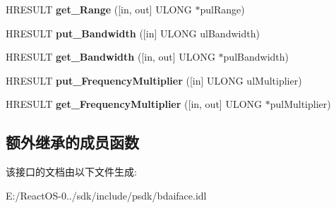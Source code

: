 \begin{DoxyCompactItemize}
H\+R\+E\+S\+U\+LT {\bfseries get\+\_\+\+Range} (\mbox{[}in, out\mbox{]} U\+L\+O\+NG $\ast$pul\+Range)
\item 
\mbox{\label{interface_i_b_d_a___frequency_filter_aa5e4841a9ed8de77df4f1f4f04350cd3}} 
H\+R\+E\+S\+U\+LT {\bfseries put\+\_\+\+Bandwidth} (\mbox{[}in\mbox{]} U\+L\+O\+NG ul\+Bandwidth)
\item 
\mbox{\label{interface_i_b_d_a___frequency_filter_a639ced69a4bcdd2f63bcd9ec842206bb}} 
H\+R\+E\+S\+U\+LT {\bfseries get\+\_\+\+Bandwidth} (\mbox{[}in, out\mbox{]} U\+L\+O\+NG $\ast$pul\+Bandwidth)
\item 
\mbox{\label{interface_i_b_d_a___frequency_filter_a9033135ba8c823d07924b8d399ed195d}} 
H\+R\+E\+S\+U\+LT {\bfseries put\+\_\+\+Frequency\+Multiplier} (\mbox{[}in\mbox{]} U\+L\+O\+NG ul\+Multiplier)
\item 
\mbox{\label{interface_i_b_d_a___frequency_filter_a455af6ea6d5e075ef03da3b80be0a41b}} 
H\+R\+E\+S\+U\+LT {\bfseries get\+\_\+\+Frequency\+Multiplier} (\mbox{[}in, out\mbox{]} U\+L\+O\+NG $\ast$pul\+Multiplier)
\end{DoxyCompactItemize}
\subsection*{额外继承的成员函数}


该接口的文档由以下文件生成\+:\begin{DoxyCompactItemize}
\item 
E\+:/\+React\+O\+S-\/0../sdk/include/psdk/bdaiface.\+idl\end{DoxyCompactItemize}
